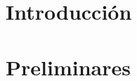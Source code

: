 \documentclass[12pt]{book}
\begin{document}

\newpage




%



\let\cleardoublepage=\clearpage
\tableofcontents
\thispagestyle{empty}
\blankpages
\geomdoc %


\setcounter{page}{1}
\chapter*{Introducción}

\blankpage
\chapter{Preliminares}


\nocite{*}
\blankpages


\end{document}
